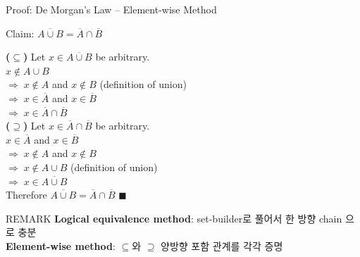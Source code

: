 \documentclass{beamer}
\begin{document}
\begin{frame}[t,shrink=6]{Proof: De Morgan's Law -- Element-wise Method}
    \small
    \vspace{0.05cm}
    \begin{block}{Claim: $\overline{A \cup B} = \overline{A} \cap \overline{B}$}
    \end{block}

    \vspace{0.1cm}
    \begin{exampleblock}{}
        \footnotesize
        \textbf{($\subseteq$)} Let $x \in \overline{A \cup B}$ be arbitrary.\\[3pt]
        \hspace{1cm} $x \notin A \cup B$\\
        \hspace{1cm} $\Rightarrow\; x \notin A$ and $x \notin B$ \hfill (definition of union)\\
        \hspace{1cm} $\Rightarrow\; x \in \overline{A}$ and $x \in \overline{B}$\\
        \hspace{1cm} $\Rightarrow\; x \in \overline{A} \cap \overline{B}$\\[6pt]
        \textbf{($\supseteq$)} Let $x \in \overline{A} \cap \overline{B}$ be arbitrary.\\[3pt]
        \hspace{1cm} $x \in \overline{A}$ and $x \in \overline{B}$\\
        \hspace{1cm} $\Rightarrow\; x \notin A$ and $x \notin B$\\
        \hspace{1cm} $\Rightarrow\; x \notin A \cup B$ \hfill (definition of union)\\
        \hspace{1cm} $\Rightarrow\; x \in \overline{A \cup B}$\\[4pt]
        Therefore $\overline{A \cup B} = \overline{A} \cap \overline{B}$ \hfill $\blacksquare$
    \end{exampleblock}

    \vspace{0.05cm}
    \begin{alertblock}{REMARK}
        \scriptsize \textbf{Logical equivalence method}: set-builder로 풀어서 한 방향 chain 으로 충분\\
        \textbf{Element-wise method}: $\subseteq$와 $\supseteq$ 양방향 포함 관계를 각각 증명
    \end{alertblock}
\end{frame}
\end{document}
